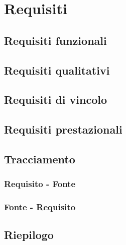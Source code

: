 \section{Requisiti}
\subsection{Requisiti funzionali}
\subsection{Requisiti qualitativi}
\subsection{Requisiti di vincolo}
\subsection{Requisiti prestazionali}
\subsection{Tracciamento}
\subsubsection{Requisito - Fonte}
\subsubsection{Fonte - Requisito}
\subsection{Riepilogo}
